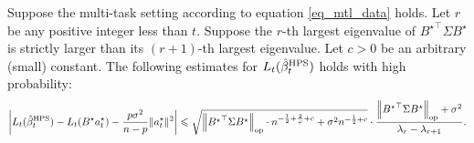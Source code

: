 \begin{theorem}\label{thm_many_tasks}
Suppose the multi-task setting according to equation \eqref{eq_mtl_data} holds.
Let $r$ be any positive integer less than $t$.
Suppose the $r$-th largest eigenvalue of ${B^\star}^\top \Sigma B^\star$ is strictly larger than its $(r+1)$-th largest eigenvalue. 
Let $c>0$ be an arbitrary (small) constant.
The following estimates for $L_t(\hat{\beta}_t^{\textup{HPS}})$ holds with high probability:
\begin{align}
	\bigabs{L_t(\hat{\beta}_t^{\MTL}) - L_t(B^{\star}a_t^{\star}) -\frac{p\sigma^2}{n-p}  \norm{a_t^{\star}}^2} 
	\le  \sqrt{\bignorm{{B^\star}^\top\Sigma B^\star}_{\op} \cdot n^{-\frac 1 2+ \frac 2{\varphi} + c}  + \sigma^2 n^{-\frac 1 2 + c}} \cdot \frac{\bignorm{{B^\star}^\top\Sigma B^\star}_{\op}+  \sigma^2}{\lambda_r - \lambda_{r+1}}. \label{Li_multi1}
\end{align}
\end{theorem}


